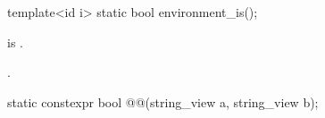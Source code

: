 \documentclass{wg21}
\begin{document}
\begin{addedblock}
\begin{itemdescr}
%
%
%
%
%
%
%
%

\end{itemdescr}

\begin{itemdecl}
template<id i>
static bool environment_is();
\end{itemdecl}

\begin{itemdescr}
\mandates {} is .

\returns {}.
\end{itemdescr}

%


\begin{itemdecl}
static constexpr bool @@(string_view a, string_view b);
\end{itemdecl}
\begin{itemdescr}


\end{itemdescr}
\end{addedblock}
\end{document}
